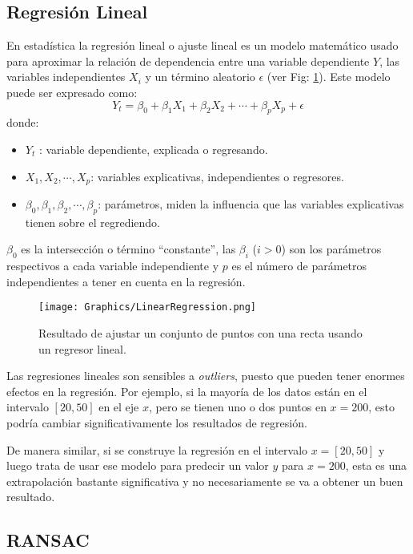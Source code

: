 \subsection{Regresión Lineal}

En estadística la regresión lineal o ajuste lineal es un modelo matemático usado para aproximar la relación de dependencia entre una variable dependiente $Y$, las variables independientes $X_i$ y un término aleatorio $\epsilon$ (ver Fig: \ref{fig:LinearRegression}). Este modelo puede ser expresado como:
$$Y_t = \beta_0 + \beta_1 X_1 + \beta_2 X_2 + \cdots + \beta_p X_p + \epsilon$$
donde:\\
\begin{itemize}
    \item $Y_t$ : variable dependiente, explicada o regresando.
    \item $X_1, X_2, \cdots, X_p$: variables explicativas, independientes o regresores.
    \item $\beta_0, \beta_1, \beta_2, \cdots, \beta_p$: parámetros, miden la influencia que las variables explicativas tienen sobre el regrediendo.
\end{itemize}

$\beta_0$ es la intersección o término ``constante'', las $\beta_i$ ($i > 0$) son los parámetros respectivos a cada variable independiente y $p$ es el número de parámetros independientes a tener en cuenta en la regresión.

\begin{figure}[h!]
    \centering
    \texttt{[image: Graphics/LinearRegression.png]}
    \caption{Resultado de ajustar un conjunto de puntos con una recta usando un regresor lineal.}
    \label{fig:LinearRegression}
\end{figure}

Las regresiones lineales son sensibles a \textit{outliers}, puesto que pueden tener enormes efectos en la regresión. Por ejemplo, si la mayoría de los datos están en el intervalo $[20,50]$ en el eje $x$, pero se tienen uno o dos puntos en $x=200$, esto podría cambiar significativamente los resultados de regresión.

De manera similar, si se construye la regresión en el intervalo $x=[20,50]$ y luego trata de usar ese modelo para predecir un valor $y$ para $x=200$, esta es una extrapolación bastante significativa y no necesariamente se va a obtener un buen resultado.

\subsection{RANSAC} \label{sec:RANSAC}

